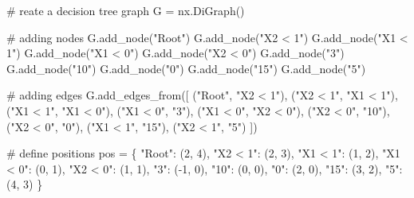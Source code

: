 \documentclass[
  letterpaper,
  DIV=11,
  numbers=noendperiod]{scrartcl}
\newenvironment{Shaded}{\begin{snugshade}}{\end{snugshade}}
\newcommand{\CommentTok}[1]{\textcolor[rgb]{0.37,0.37,0.37}{#1}}
\newcommand{\DecValTok}[1]{\textcolor[rgb]{0.68,0.00,0.00}{#1}}
\newcommand{\NormalTok}[1]{\textcolor[rgb]{0.00,0.23,0.31}{#1}}
\newcommand{\OperatorTok}[1]{\textcolor[rgb]{0.37,0.37,0.37}{#1}}
\newcommand{\StringTok}[1]{\textcolor[rgb]{0.13,0.47,0.30}{#1}}
\begin{document}
\begin{Shaded}
\begin{Highlighting}[]
\CommentTok{\# reate a decision tree graph}
\NormalTok{G }\OperatorTok{=}\NormalTok{ nx.DiGraph()}

\CommentTok{\# adding nodes}
\NormalTok{G.add\_node(}\StringTok{"Root"}\NormalTok{)}
\NormalTok{G.add\_node(}\StringTok{"X2 \textless{} 1"}\NormalTok{)}
\NormalTok{G.add\_node(}\StringTok{"X1 \textless{} 1"}\NormalTok{)}
\NormalTok{G.add\_node(}\StringTok{"X1 \textless{} 0"}\NormalTok{)}
\NormalTok{G.add\_node(}\StringTok{"X2 \textless{} 0"}\NormalTok{)}
\NormalTok{G.add\_node(}\StringTok{"3"}\NormalTok{)}
\NormalTok{G.add\_node(}\StringTok{"10"}\NormalTok{)}
\NormalTok{G.add\_node(}\StringTok{"0"}\NormalTok{)}
\NormalTok{G.add\_node(}\StringTok{"15"}\NormalTok{)}
\NormalTok{G.add\_node(}\StringTok{"5"}\NormalTok{)}

\CommentTok{\# adding edges}
\NormalTok{G.add\_edges\_from([}
\NormalTok{    (}\StringTok{"Root"}\NormalTok{, }\StringTok{"X2 \textless{} 1"}\NormalTok{), (}\StringTok{"X2 \textless{} 1"}\NormalTok{, }\StringTok{"X1 \textless{} 1"}\NormalTok{), (}\StringTok{"X1 \textless{} 1"}\NormalTok{,}
                                               \StringTok{"X1 \textless{} 0"}\NormalTok{), (}\StringTok{"X1 \textless{} 0"}\NormalTok{, }\StringTok{"3"}\NormalTok{), (}\StringTok{"X1 \textless{} 0"}\NormalTok{, }\StringTok{"X2 \textless{} 0"}\NormalTok{),}
\NormalTok{    (}\StringTok{"X2 \textless{} 0"}\NormalTok{, }\StringTok{"10"}\NormalTok{), (}\StringTok{"X2 \textless{} 0"}\NormalTok{, }\StringTok{"0"}\NormalTok{), (}\StringTok{"X1 \textless{} 1"}\NormalTok{, }\StringTok{"15"}\NormalTok{), (}\StringTok{"X2 \textless{} 1"}\NormalTok{, }\StringTok{"5"}\NormalTok{)}
\NormalTok{])}

\CommentTok{\# define positions}
\NormalTok{pos }\OperatorTok{=}\NormalTok{ \{}
    \StringTok{"Root"}\NormalTok{: (}\DecValTok{2}\NormalTok{, }\DecValTok{4}\NormalTok{),}
    \StringTok{"X2 \textless{} 1"}\NormalTok{: (}\DecValTok{2}\NormalTok{, }\DecValTok{3}\NormalTok{),}
    \StringTok{"X1 \textless{} 1"}\NormalTok{: (}\DecValTok{1}\NormalTok{, }\DecValTok{2}\NormalTok{),}
    \StringTok{"X1 \textless{} 0"}\NormalTok{: (}\DecValTok{0}\NormalTok{, }\DecValTok{1}\NormalTok{),}
    \StringTok{"X2 \textless{} 0"}\NormalTok{: (}\DecValTok{1}\NormalTok{, }\DecValTok{1}\NormalTok{),}
    \StringTok{"3"}\NormalTok{: (}\OperatorTok{{-}}\DecValTok{1}\NormalTok{, }\DecValTok{0}\NormalTok{),}
    \StringTok{"10"}\NormalTok{: (}\DecValTok{0}\NormalTok{, }\DecValTok{0}\NormalTok{),}
    \StringTok{"0"}\NormalTok{: (}\DecValTok{2}\NormalTok{, }\DecValTok{0}\NormalTok{),}
    \StringTok{"15"}\NormalTok{: (}\DecValTok{3}\NormalTok{, }\DecValTok{2}\NormalTok{),}
    \StringTok{"5"}\NormalTok{: (}\DecValTok{4}\NormalTok{, }\DecValTok{3}\NormalTok{)}
\NormalTok{\}}


\end{Highlighting}
\end{Shaded}
\end{document}
